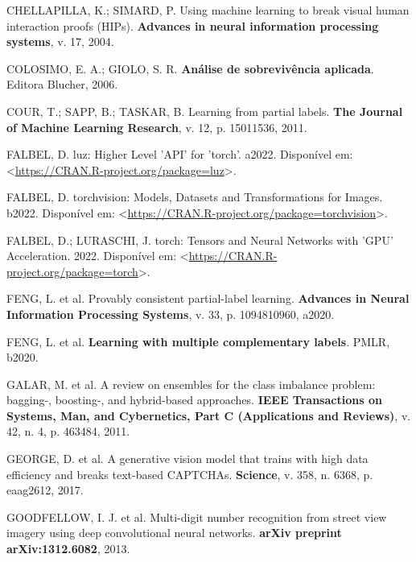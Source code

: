 \documentclass[12pt,twoside,brazilian]{book}
\newlength{\cslhangindent}
\newlength{\cslentryspacingunit} %
\newenvironment{CSLReferences}[2] %
 {%
  \setlength{\parindent}{0pt}
  \ifodd #1
  \let\oldpar\par
  \def\par{\hangindent=\cslhangindent\oldpar}
  \fi
  \setlength{\parskip}{#2\cslentryspacingunit}
 }%
 {}
\begin{document}
\begin{CSLReferences}{0}{1}
\leavevmode{}%
CHELLAPILLA, K.; SIMARD, P. Using machine learning to break visual human
interaction proofs (HIPs). \textbf{Advances in neural information
processing systems}, v. 17, 2004.

\leavevmode{}%
COLOSIMO, E. A.; GIOLO, S. R. \textbf{Análise de sobrevivência
aplicada}. Editora Blucher, 2006.

\leavevmode{}%
COUR, T.; SAPP, B.; TASKAR, B. Learning from partial labels. \textbf{The
Journal of Machine Learning Research}, v. 12, p. 15011536, 2011.

\leavevmode{}%
FALBEL, D. luz: Higher Level 'API' for 'torch'. a2022. Disponível em:
\textless{}\url{https://CRAN.R-project.org/package=luz}\textgreater.

\leavevmode{}%
FALBEL, D. torchvision: Models, Datasets and Transformations for Images.
b2022. Disponível em:
\textless{}\url{https://CRAN.R-project.org/package=torchvision}\textgreater.

\leavevmode{}%
FALBEL, D.; LURASCHI, J. torch: Tensors and Neural Networks with 'GPU'
Acceleration. 2022. Disponível em:
\textless{}\url{https://CRAN.R-project.org/package=torch}\textgreater.

\leavevmode{}%
FENG, L. et al. Provably consistent partial-label learning.
\textbf{Advances in Neural Information Processing Systems}, v. 33, p.
1094810960, a2020.

\leavevmode{}%
FENG, L. et al. \textbf{Learning with multiple complementary labels}.
PMLR, b2020.

\leavevmode{}%
GALAR, M. et al. A review on ensembles for the class imbalance problem:
bagging-, boosting-, and hybrid-based approaches. \textbf{IEEE
Transactions on Systems, Man, and Cybernetics, Part C (Applications and
Reviews)}, v. 42, n. 4, p. 463484, 2011.

\leavevmode{}%
GEORGE, D. et al. A generative vision model that trains with high data
efficiency and breaks text-based CAPTCHAs. \textbf{Science}, v. 358, n.
6368, p. eaag2612, 2017.

\leavevmode{}%
GOODFELLOW, I. J. et al. Multi-digit number recognition from street view
imagery using deep convolutional neural networks. \textbf{arXiv preprint
arXiv:1312.6082}, 2013.


\end{CSLReferences}
\end{document}
